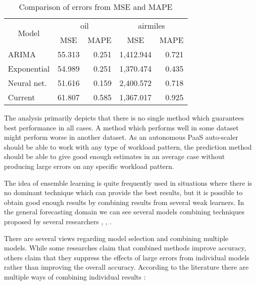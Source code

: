 \begin{table}[]
\centering
\caption{Comparison of errors from MSE and MAPE}
\label{my-label}
\begin{tabular}{|l|r|r|r|r|}
\hline
\multicolumn{1}{|c|}{\multirow{2}{*}{Model}} & \multicolumn{2}{c|}{oil}                             & \multicolumn{2}{c|}{airmiles}                        \\ \cline{2-5} 
\multicolumn{1}{|c|}{}                       & \multicolumn{1}{c|}{MSE} & \multicolumn{1}{c|}{MAPE} & \multicolumn{1}{c|}{MSE} & \multicolumn{1}{c|}{MAPE} \\ \hline
ARIMA                                        & 55.313                 & 0.251                   & 1,412.944              & 0.721                   \\ \hline
Exponential                                  & 54.989                 & 0.251                   & 1,370.474              & 0.435                   \\ \hline
Neural net.                                  & 51.616                 & 0.159                   & 2,400.572              & 0.718                   \\ \hline
Current                                      & 61.807                 & 0.585                   & 1,367.017              & 0.925                   \\ \hline
\end{tabular}
\end{table}

The analysis primarily depicts that there is no single method which guarantees best performance in all cases. A method which performs well in some dataset might perform worse in another dataset. As an autonomous PaaS auto-scaler should be able to work with any type of workload pattern, the prediction method should be able to give good enough estimates in an average case without producing large errors on any specific workload pattern.

The idea of ensemble learning is quite frequently used in situations where there is no dominant technique which can provide the best results, but it is possible to obtain good enough results by combining results from several weak learners. In the general forecasting domain we can see several models combining techniques proposed by several researchers \cite{Wagner_2011}, \cite{Zhang_2003}, \cite{Zou_2004}.

There are several views regarding model selection and combining multiple models. While some researches claim that combined methods improve accuracy, others claim that they suppress the effects of large errors from individual models rather than improving the overall accuracy. According to the literature there are multiple ways of combining individual results \cite{Adhikari_2012}:

